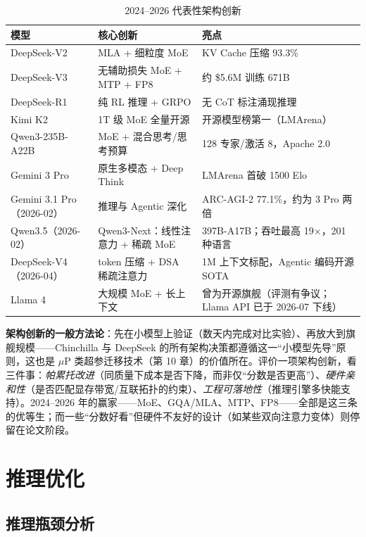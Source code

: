 \documentclass[12pt,a4paper]{article}
\begin{document}
\begin{table}[htbp]
\centering
\small
\begin{tabular}{@{}lp{5.6cm}p{4.6cm}@{}}
\toprule
\textbf{模型} & \textbf{核心创新} & \textbf{亮点}\\
\midrule
DeepSeek-V2 & MLA + 细粒度 MoE & KV Cache 压缩 93.3\%\\
DeepSeek-V3 & 无辅助损失 MoE + MTP + FP8 & 约 \$5.6M 训练 671B\\
DeepSeek-R1 & 纯 RL 推理 + GRPO & 无 CoT 标注涌现推理\\
Kimi K2 & 1T 级 MoE 全量开源 & 开源模型榜第一（LMArena）\\
Qwen3-235B-A22B & MoE + 混合思考/思考预算 & 128 专家/激活 8，Apache 2.0\\
Gemini 3 Pro & 原生多模态 + Deep Think & LMArena 首破 1500 Elo\\
Gemini 3.1 Pro（2026-02） & 推理与 Agentic 深化 & ARC-AGI-2 77.1\%，约为 3 Pro 两倍\\
Qwen3.5（2026-02） & Qwen3-Next：线性注意力 + 稀疏 MoE & 397B-A17B；吞吐最高 19$\times$，201 种语言\\
DeepSeek-V4（2026-04） & token 压缩 + DSA 稀疏注意力 & 1M 上下文标配，Agentic 编码开源 SOTA\\
Llama 4 & 大规模 MoE + 长上下文 & 曾为开源旗舰（评测有争议；Llama API 已于 2026-07 下线）\\
\bottomrule
\end{tabular}
\caption{2024--2026 代表性架构创新}
\end{table}

\textbf{架构创新的一般方法论}：先在小模型上验证（数天内完成对比实验）、再放大到旗舰规模——Chinchilla 与 DeepSeek 的所有架构决策都遵循这一“小模型先导”原则，这也是 $\mu$P 类超参迁移技术（第 10 章）的价值所在。评价一项架构创新，看三件事：\emph{帕累托改进}（同质量下成本是否下降，而非仅“分数是否更高”）、\emph{硬件亲和性}（是否匹配显存带宽/互联拓扑的约束）、\emph{工程可落地性}（推理引擎多快能支持）。2024--2026 年的赢家——MoE、GQA/MLA、MTP、FP8——全部是这三条的优等生；而一些“分数好看”但硬件不友好的设计（如某些双向注意力变体）则停留在论文阶段。

\section{推理优化}

\subsection{推理瓶颈分析}
\end{document}
